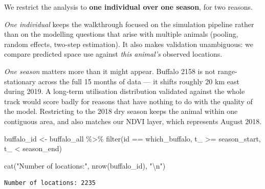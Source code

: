 \documentclass[
  letterpaper,
  DIV=11,
  numbers=noendperiod]{scrartcl}
\newenvironment{Shaded}{\begin{snugshade}}{\end{snugshade}}
\newcommand{\FunctionTok}[1]{\textcolor[rgb]{0.28,0.35,0.67}{#1}}
\newcommand{\NormalTok}[1]{\textcolor[rgb]{0.00,0.23,0.31}{#1}}
\newcommand{\OtherTok}[1]{\textcolor[rgb]{0.00,0.23,0.31}{#1}}
\newcommand{\SpecialCharTok}[1]{\textcolor[rgb]{0.37,0.37,0.37}{#1}}
\newcommand{\StringTok}[1]{\textcolor[rgb]{0.13,0.47,0.30}{#1}}
\begin{document}
We restrict the analysis to \textbf{one individual over one season}, for
two reasons.

\emph{One individual} keeps the walkthrough focused on the simulation
pipeline rather than on the modelling questions that arise with multiple
animals (pooling, random effects, two-step estimation). It also makes
validation unambiguous: we compare predicted space use against
\emph{this animal's} observed locations.

\emph{One season} matters more than it might appear. Buffalo 2158 is not
range-stationary across the full 15 months of data --- it shifts roughly
20 km east during 2019. A long-term utilisation distribution validated
against the whole track would score badly for reasons that have nothing
to do with the quality of the model. Restricting to the 2018 dry season
keeps the animal within one contiguous area, and also matches our NDVI
layer, which represents August 2018.

\begin{Shaded}
\begin{Highlighting}[]
\NormalTok{buffalo\_id }\OtherTok{\textless{}{-}}\NormalTok{ buffalo\_all }\SpecialCharTok{\%\textgreater{}\%}
  \FunctionTok{filter}\NormalTok{(id }\SpecialCharTok{==}\NormalTok{ which\_buffalo,}
\NormalTok{         t\_ }\SpecialCharTok{\textgreater{}=}\NormalTok{ season\_start,}
\NormalTok{         t\_ }\SpecialCharTok{\textless{}}\NormalTok{  season\_end)}

\FunctionTok{cat}\NormalTok{(}\StringTok{"Number of locations:"}\NormalTok{, }\FunctionTok{nrow}\NormalTok{(buffalo\_id), }\StringTok{"}\SpecialCharTok{\textbackslash{}n}\StringTok{"}\NormalTok{)}
\end{Highlighting}
\end{Shaded}

\begin{verbatim}
Number of locations: 2235 
\end{verbatim}

\begin{Shaded}
\end{Shaded}
\end{document}
